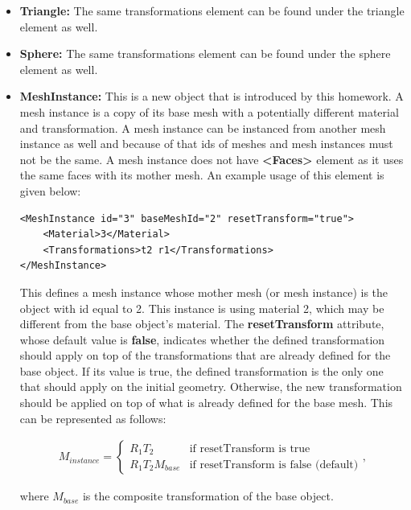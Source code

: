 \documentclass[12pt]{article}
\begin{document}
\begin{itemize}
\begin{align}
M = R_2 S_2 T_1 R_1,
\end{align}

and the transformed coordinates of a vertex $v$ will be equal to:

\begin{align}
v' = M v
\end{align}

\item \textbf{Triangle:} The same transformations element can be found
under the triangle element as well.

\item \textbf{Sphere:} The same transformations element can be found
under the sphere element as well.

\item \textbf{MeshInstance:} This is a new object that is introduced by
this homework. A mesh instance is a copy of its base mesh with a
potentially different material and transformation. A mesh instance can
be instanced from another mesh instance as well and because of that ids
of meshes and mesh instances must not be the same. A mesh instance does
not have \textbf{\textless Faces\textgreater} element as it uses the same faces
with its mother mesh. An example usage of this element is given below:

\begin{verbatim}
<MeshInstance id="3" baseMeshId="2" resetTransform="true">
    <Material>3</Material>
    <Transformations>t2 r1</Transformations>
</MeshInstance>
\end{verbatim}

This defines a mesh instance whose mother mesh (or mesh instance) is the
object with id equal to 2. This instance is using material 2, which may
be different from the base object's material. The \textbf{resetTransform} 
attribute, whose default value is \textbf{false}, indicates
whether the defined transformation should apply on top of the
transformations that are already defined for the base object. If its
value is true, the defined transformation is the only one that should
apply on the initial geometry. Otherwise, the new transformation should
be applied on top of what is already defined for the base mesh. This can
be represented as follows:

\begin{align}
M_{instance} = 
\begin{cases}
R_1 T_2 & \textrm{if resetTransform is true}\\
R_1 T_2 M_{base} & \textrm{if resetTransform is false (default)}
\end{cases},
\end{align}

where $M_{base}$ is the composite transformation of the base object.

\end{itemize}
\end{document}
